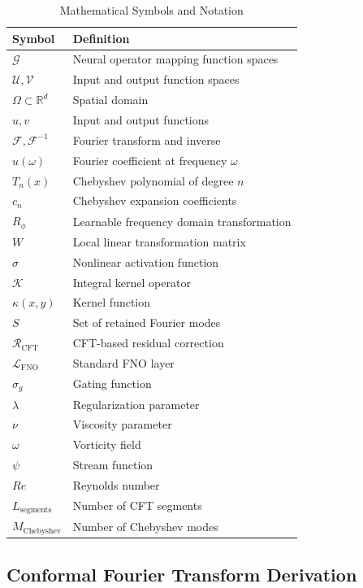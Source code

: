 \documentclass[11pt,twocolumn]{article}
\begin{document}
\begin{table}[h]
\centering
\caption{Mathematical Symbols and Notation}
\label{tab:notation}
\footnotesize
\begin{tabular}{@{}p{1.8cm}p{5cm}@{}}
\toprule
\textbf{Symbol} & \textbf{Definition} \\
\midrule
$\mathcal{G}$ & Neural operator mapping function spaces \\
$\mathcal{U}, \mathcal{V}$ & Input and output function spaces \\
$\Omega \subset \mathbb{R}^d$ & Spatial domain \\
$u, v$ & Input and output functions \\
$\mathcal{F}, \mathcal{F}^{-1}$ & Fourier transform and inverse \\
$\hat{u}(\omega)$ & Fourier coefficient at frequency $\omega$ \\
$T_n(x)$ & Chebyshev polynomial of degree $n$ \\
$c_n$ & Chebyshev expansion coefficients \\
$R_\phi$ & Learnable frequency domain transformation \\
$W$ & Local linear transformation matrix \\
$\sigma$ & Nonlinear activation function \\
$\mathcal{K}$ & Integral kernel operator \\
$\kappa(x,y)$ & Kernel function \\
$S$ & Set of retained Fourier modes \\
$\mathcal{R}_{\text{CFT}}$ & CFT-based residual correction \\
$\mathcal{L}_{\text{FNO}}$ & Standard FNO layer \\
$\sigma_g$ & Gating function \\
$\lambda$ & Regularization parameter \\
$\nu$ & Viscosity parameter \\
$\omega$ & Vorticity field \\
$\psi$ & Stream function \\
$Re$ & Reynolds number \\
$L_{\text{segments}}$ & Number of CFT segments \\
$M_{\text{Chebyshev}}$ & Number of Chebyshev modes \\
\bottomrule
\end{tabular}
\end{table}

\subsection{Conformal Fourier Transform Derivation}
\label{app:cft_derivation}
\end{document}
